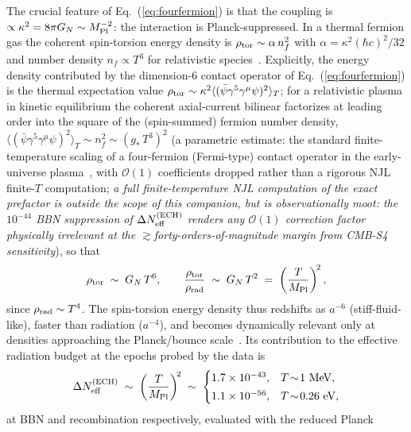 \documentclass[aps,prd,twocolumn,superscriptaddress,showpacs,preprintnumbers,nofootinbib,longbibliography,floatfix]{revtex4-2}
\newcommand{\Neff}{N_{\rm eff}}
\begin{document}
The crucial feature of Eq.~(\ref{eq:fourfermion}) is that the coupling is
$\propto\kappa^2=8\pi G_N\sim M_{\rm Pl}^{-2}$: the interaction is
Planck-suppressed. In a thermal fermion gas the coherent spin-torsion energy
density is $\rho_{\rm tor}\sim\alpha\,n_f^2$ with $\alpha=\kappa^2(\hbar
c)^2/32$ and number density $n_f\propto T^3$ for relativistic
species~\cite{UngerPoplawski2019}. Explicitly, the energy density
contributed by the dimension-6 contact operator of
Eq.~(\ref{eq:fourfermion}) is the thermal expectation value
$\rho_{\rm tor}\sim\kappa^2\langle(\bar\psi\gamma^5\gamma^\mu\psi)^2\rangle_T$;
for a relativistic plasma in kinetic equilibrium the coherent axial-current
bilinear factorizes at leading order into the square of the (spin-summed)
fermion number density, $\langle(\bar\psi\gamma^5\gamma^\mu\psi)^2\rangle_T
\sim n_f^2 \sim (g_\ast\,T^3)^2$ (a parametric estimate: the standard
finite-temperature scaling of a four-fermion (Fermi-type) contact operator in
the early-universe plasma~\cite{KapustaGale2006}, with $\mathcal{O}(1)$
coefficients dropped rather than a rigorous NJL finite-$T$ computation;
\emph{a full finite-temperature NJL computation of the exact prefactor is outside the scope
of this companion, but is observationally moot: the $10^{-44}$ BBN suppression
of $\Delta\Neff^{\rm(ECH)}$ renders any $\mathcal{O}(1)$ correction factor
physically irrelevant at the $\gtrsim$forty-orders-of-magnitude margin from
CMB-S4 sensitivity}), so that
\begin{equation}
\rho_{\rm tor}\;\sim\;G_N\,T^6 ,\qquad
\frac{\rho_{\rm tor}}{\rho_{\rm rad}}\;\sim\;G_N\,T^2\;=\;
\left(\frac{T}{M_{\rm Pl}}\right)^{\!2} ,
\label{eq:torsion_ratio}
\end{equation}
since $\rho_{\rm rad}\sim T^4$. The spin-torsion energy density thus redshifts
as $a^{-6}$ (stiff-fluid-like), faster than radiation ($a^{-4}$), and becomes
dynamically relevant only at densities approaching the Planck/bounce
scale~\cite{UngerPoplawski2019}. Its contribution to the effective radiation
budget at the epochs probed by the data is
\begin{equation}
\Delta\Neff^{\rm(ECH)}\;\sim\;\left(\frac{T}{M_{\rm Pl}}\right)^{\!2}
\;\sim\;
\begin{cases}
1.7\times 10^{-43}, & T\!\sim\!1\ \mathrm{MeV},\\[2pt]
1.1\times 10^{-56}, & T\!\sim\!0.26\ \mathrm{eV},
\end{cases}
\label{eq:neff_bound}
\end{equation}
at BBN and recombination respectively, evaluated with the reduced Planck
\end{document}
